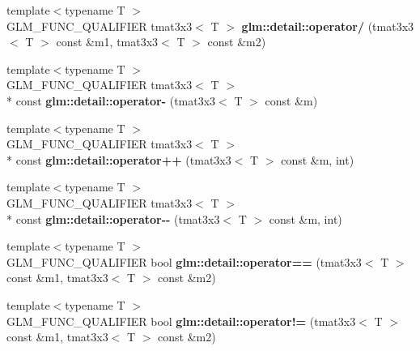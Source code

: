 \begin{DoxyCompactItemize}
\item 
\hypertarget{namespaceglm_1_1detail_ac1649184aad412f56831fc1a8b6bc9de}{{\footnotesize template$<$typename T $>$ }\\G\-L\-M\-\_\-\-F\-U\-N\-C\-\_\-\-Q\-U\-A\-L\-I\-F\-I\-E\-R tmat3x3$<$ T $>$ {\bfseries glm\-::detail\-::operator/} (tmat3x3$<$ T $>$ const \&m1, tmat3x3$<$ T $>$ const \&m2)}\label{namespaceglm_1_1detail_ac1649184aad412f56831fc1a8b6bc9de}

\item 
\hypertarget{namespaceglm_1_1detail_a0ce44ce808f162f9e97a2f275975b611}{{\footnotesize template$<$typename T $>$ }\\G\-L\-M\-\_\-\-F\-U\-N\-C\-\_\-\-Q\-U\-A\-L\-I\-F\-I\-E\-R tmat3x3$<$ T $>$\\*
 const {\bfseries glm\-::detail\-::operator-\/} (tmat3x3$<$ T $>$ const \&m)}\label{namespaceglm_1_1detail_a0ce44ce808f162f9e97a2f275975b611}

\item 
\hypertarget{namespaceglm_1_1detail_a48c8755597f13f46339939814ca19e5b}{{\footnotesize template$<$typename T $>$ }\\G\-L\-M\-\_\-\-F\-U\-N\-C\-\_\-\-Q\-U\-A\-L\-I\-F\-I\-E\-R tmat3x3$<$ T $>$\\*
 const {\bfseries glm\-::detail\-::operator++} (tmat3x3$<$ T $>$ const \&m, int)}\label{namespaceglm_1_1detail_a48c8755597f13f46339939814ca19e5b}

\item 
\hypertarget{namespaceglm_1_1detail_ad1cecbeb2bde6f87f6054c17d554e496}{{\footnotesize template$<$typename T $>$ }\\G\-L\-M\-\_\-\-F\-U\-N\-C\-\_\-\-Q\-U\-A\-L\-I\-F\-I\-E\-R tmat3x3$<$ T $>$\\*
 const {\bfseries glm\-::detail\-::operator-\/-\/} (tmat3x3$<$ T $>$ const \&m, int)}\label{namespaceglm_1_1detail_ad1cecbeb2bde6f87f6054c17d554e496}

\item 
\hypertarget{namespaceglm_1_1detail_a2690c299d39a5f04d05e4b14f8a4fcfe}{{\footnotesize template$<$typename T $>$ }\\G\-L\-M\-\_\-\-F\-U\-N\-C\-\_\-\-Q\-U\-A\-L\-I\-F\-I\-E\-R bool {\bfseries glm\-::detail\-::operator==} (tmat3x3$<$ T $>$ const \&m1, tmat3x3$<$ T $>$ const \&m2)}\label{namespaceglm_1_1detail_a2690c299d39a5f04d05e4b14f8a4fcfe}

\item 
\hypertarget{namespaceglm_1_1detail_aa86795cb0a4455548dc35fa6edf2e034}{{\footnotesize template$<$typename T $>$ }\\G\-L\-M\-\_\-\-F\-U\-N\-C\-\_\-\-Q\-U\-A\-L\-I\-F\-I\-E\-R bool {\bfseries glm\-::detail\-::operator!=} (tmat3x3$<$ T $>$ const \&m1, tmat3x3$<$ T $>$ const \&m2)}\label{namespaceglm_1_1detail_aa86795cb0a4455548dc35fa6edf2e034}

\end{DoxyCompactItemize}



